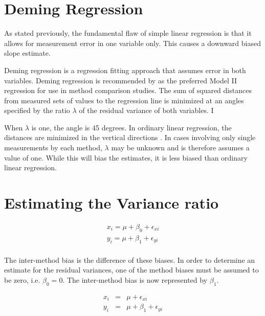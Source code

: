 \documentclass[12pt, a4paper]{report}
\theoremstyle{plain}
\theoremstyle{definition}
\theoremstyle{remark}
\begin{document}
\section{Deming Regression}

As stated previously, the fundamental flaw of simple linear regression is that it allows for measurement error in one variable only. This causes a downward biased slope estimate.

Deming regression is a regression fitting approach that assumes error in both variables. Deming regression is recommended by \citet*{CornCoch} as the
preferred Model II regression for use in method comparison
studies. The sum of squared distances from measured sets of values to the regression line is minimized at an angles specified by the ratio $\lambda$ of the residual variance of both variables. I

When $\lambda$ is one, the angle is 45 degrees. In ordinary linear regression, the distances are minimized in the vertical directions \citep{linnet99}.
In cases involving only single measurements by each method, $\lambda$ may be unknown and is therefore assumes a value of one. While this will bias the estimates, it is less biased than ordinary linear regression.


\section{Estimating the Variance ratio}


\begin{eqnarray*}
	x_{i} = \mu +  \beta_{0} + \epsilon_{xi}\\
	y_{i} = \mu +  \beta_{1} + \epsilon_{yi}\\
\end{eqnarray*}

The inter-method bias is the difference of these biases. In order
to determine an estimate for the residual variances, one of the
method biases must be assumed to be zero, i.e. $\beta_{0} = 0$.
The inter-method bias is now represented by $\beta_{1}$.

\begin{eqnarray*}
	x_{i} &=& \mu + \epsilon_{xi}\\
	y_{i} &=& \mu +  \beta_{1} + \epsilon_{yi}\\
\end{eqnarray*}
\end{document}
